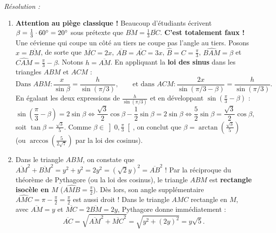 \begin{exemple}
\begin{center}
\end{center}

\emph{Résolution :}
\begin{enumerate}
    \item \textbf{Attention au piège classique !} Beaucoup d'étudiants écrivent $\beta = \frac{1}{3}\cdot 60\degree = 20\degree$ sous prétexte que $\overline{BM} = \frac{1}{3}\overline{BC}$. \textbf{C'est totalement faux !} Une cévienne qui coupe un côté au tiers ne coupe pas l'angle au tiers.
    Posons $x = \overline{BM}$, de sorte que $\overline{MC} = 2x$, $\overline{AB} = \overline{AC} = 3x$, $\widehat{B} = \widehat{C} = \frac{\pi}{3}$, $\widehat{BAM} = \beta$ et $\widehat{CAM} = \frac{\pi}{3} - \beta$. Notons $h = \overline{AM}$. En appliquant la \textbf{loi des sinus} dans les triangles $ABM$ et $ACM$ :
    \[
        \text{Dans } ABM : \frac{x}{\sin\beta} = \frac{h}{\sin(\pi/3)}, \qquad \text{et dans } ACM : \frac{2x}{\sin(\pi/3 - \beta)} = \frac{h}{\sin(\pi/3)}.
    \]
    En égalant les deux expressions de $\frac{h}{\sin(\pi/3)}$ et en développant $\sin(\frac{\pi}{3}-\beta)$ :
    \[
        \sin\left(\frac{\pi}{3} - \beta\right) = 2\sin\beta \iff \frac{\sqrt{3}}{2}\cos\beta - \frac{1}{2}\sin\beta = 2\sin\beta \iff \frac{5}{2}\sin\beta = \frac{\sqrt{3}}{2}\cos\beta,
    \]
    soit $\tan\beta = \frac{\sqrt{3}}{5}$. Comme $\beta \in \left]0, \frac{\pi}{3}\right[$, on conclut que $\boxed{\beta = \arctan\left(\frac{\sqrt{3}}{5}\right)}$ (ou $\arccos\left(\frac{5}{2\sqrt{7}}\right)$ par la loi des cosinus).
    \item Dans le triangle $ABM$, on constate que $\overline{AM}^2 + \overline{BM}^2 = y^2 + y^2 = 2y^2 = (\sqrt{2}y)^2 = \overline{AB}^2$ ! Par la réciproque du théorème de Pythagore (ou la loi des cosinus), le triangle $ABM$ est \textbf{rectangle isocèle en $M$} ($\widehat{AMB} = \frac{\pi}{2}$). Dès lors, son angle supplémentaire $\widehat{AMC} = \pi - \frac{\pi}{2} = \frac{\pi}{2}$ est aussi droit ! Dans le triangle $AMC$ rectangle en $M$, avec $\overline{AM} = y$ et $\overline{MC} = 2\overline{BM} = 2y$, Pythagore donne immédiatement :
    \[
        \overline{AC} = \sqrt{\overline{AM}^2 + \overline{MC}^2} = \sqrt{y^2 + (2y)^2} = \boxed{y\sqrt{5}}.
    \]
\end{enumerate}
\end{exemple}

